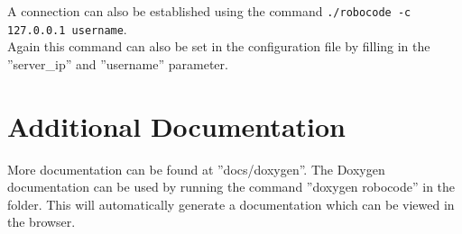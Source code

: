\documentclass[12pt]{report}
\begin{document}
A connection can also be established using the command \lstinline{./robocode -c 127.0.0.1 username}. \\

Again this command can also be set in the configuration file by filling in the ''server\_ip'' and ''username'' parameter.

\section{Additional Documentation}

More documentation can be found at ''docs/doxygen''. The Doxygen documentation can be used by running the command ''doxygen robocode'' in the folder. This will automatically generate a documentation which can be viewed in the browser.
\end{document}
